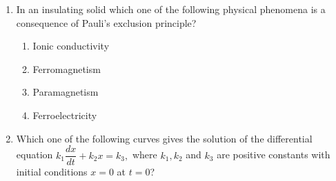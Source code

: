 \documentclass[14pt, a4paper]{extarticle}
\begin{document}
\begin{enumerate}[label=\textbf{Q. \arabic*}]
\item In an insulating solid which one of the following physical phenomena is a consequence of Pauli's exclusion principle?
    \begin{enumerate}
        \item Ionic conductivity
        \item Ferromagnetism
        \item Paramagnetism
        \item Ferroelectricity
    \end{enumerate}

\item Which one of the following curves gives the solution of the differential equation
$ k_1\dfrac{dx}{dt} + k_2x = k_3, $
where $k_1, k_2$ and $k_3$ are positive constants with initial conditions $x=0$ at $t=0$?
\begin{enumerate}
\end{enumerate}
\end{enumerate}
\end{document}

